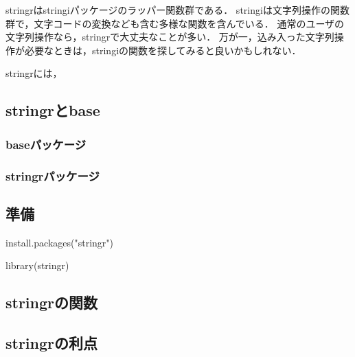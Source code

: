 \documentclass[
]{article}
\newenvironment{Shaded}{\begin{snugshade}}{\end{snugshade}}
\newcommand{\FunctionTok}[1]{\textcolor[rgb]{0.00,0.00,0.00}{#1}}
\newcommand{\NormalTok}[1]{#1}
\newcommand{\StringTok}[1]{\textcolor[rgb]{0.31,0.60,0.02}{#1}}
\begin{document}
stringrはstringiパッケージのラッパー関数群である．
stringiは文字列操作の関数群で，文字コードの変換なども含む多様な関数を含んでいる．
通常のユーザの文字列操作なら，stringrで大丈夫なことが多い．
万が一，込み入った文字列操作が必要なときは，stringiの関数を探してみると良いかもしれない．

stringrには，

\hypertarget{stringrux3068base}{%
\subsection{stringrとbase}\label{stringrux3068base}}

\hypertarget{baseux30d1ux30c3ux30b1ux30fcux30b8-1}{%
\subsubsection{baseパッケージ}\label{baseux30d1ux30c3ux30b1ux30fcux30b8-1}}

\hypertarget{stringrux30d1ux30c3ux30b1ux30fcux30b8}{%
\subsubsection{stringrパッケージ}\label{stringrux30d1ux30c3ux30b1ux30fcux30b8}}

\hypertarget{ux6e96ux5099-1}{%
\subsection{準備}\label{ux6e96ux5099-1}}

\begin{Shaded}
\begin{Highlighting}[]
\FunctionTok{install.packages}\NormalTok{(}\StringTok{"stringr"}\NormalTok{)}
\end{Highlighting}
\end{Shaded}

\begin{Shaded}
\begin{Highlighting}[]
\FunctionTok{library}\NormalTok{(stringr)}
\end{Highlighting}
\end{Shaded}

\hypertarget{stringrux306eux95a2ux6570}{%
\subsection{stringrの関数}\label{stringrux306eux95a2ux6570}}

\hypertarget{stringrux306eux5229ux70b9}{%
\subsection{stringrの利点}\label{stringrux306eux5229ux70b9}}
\end{document}
